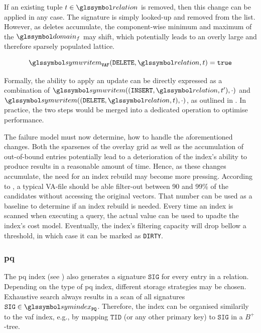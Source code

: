 If an existing tuple $t \in \relation$ is removed, then this change can be applied in any case. The signature is simply looked-up and removed from the list. However, as deletes accumulate, the component-wise minimum and maximum of the $\domain_f$ may shift, which potentially leads to an overly large and therefore sparsely populated lattice.

\begin{equation}
    \label{equation:write_model_delete_vaf}
    \symwritem_{\mathtt{VAF}}(\mathtt{DELETE}, \relation, t) = \mathtt{true}
\end{equation}

Formally, the ability to apply an update can be directly expressed as a combination of $ \symwritem((\mathtt{INSERT}, \relation, t^{\prime}),\cdot)$ and $ \symwritem((\mathtt{DELETE}, \relation, t), \cdot)$, as outlined in . In practice, the two steps would be merged into a dedicated operation to optimise performance.

The failure model must now determine, how to handle the aforementioned changes. Both the sparsenes of the overlay grid as well as the accumulation of out-of-bound entries potentially lead to a deterioration of the index's ability to produce results in a reasonable amount of time. Hence, as these changes accumulate, the need for an index rebuild may become more pressing. According to \cite{Weber:1998Va}, a typical VA-file should be able filter-out between 90 and 99\% of the candidates without accessing the original vectors. That number can be used as a baseline to determine if an index rebuild is needed. Every time an index is scanned when executing a query, the actual value can be used to upadte the index's cost model. Eventually, the index's filtering capacity will drop bellow a threshold, in which case it can be marked as \texttt{DIRTY}.

\subsubsection{\texorpdfstring{\acrfull{pq}}{PQ}}

The \acrshort{pq} index (see ) also generates a signature $\mathtt{SIG}$ for every entry in a relation. Depending on the type of \acrshort{pq} index, different storage strategies may be chosen. Exhaustive search always results in a scan of all signatures $\mathtt{SIG} \in \symindex_{\mathtt{PQ}}$. Therefore, the index can be organised similarily to the \acrshort{vaf} index, e.g., by mapping $\mathtt{TID}$  (or any other primary key) to $\mathtt{SIG}$ in a $B^{+}$-tree. 

